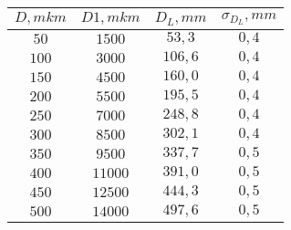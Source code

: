 \begin{tabular}{| c | c | c | c |}
\hline
$D, mkm$ & $D1, mkm$ & $D_L, mm$ & $\sigma_{D_L}, mm$\\
\hline
$50$ & $1500$ & $53,3$ & $0,4$\\
\hline
$100$ & $3000$ & $106,6$ & $0,4$\\
\hline
$150$ & $4500$ & $160,0$ & $0,4$\\
\hline
$200$ & $5500$ & $195,5$ & $0,4$\\
\hline
$250$ & $7000$ & $248,8$ & $0,4$\\
\hline
$300$ & $8500$ & $302,1$ & $0,4$\\
\hline
$350$ & $9500$ & $337,7$ & $0,5$\\
\hline
$400$ & $11000$ & $391,0$ & $0,5$\\
\hline
$450$ & $12500$ & $444,3$ & $0,5$\\
\hline
$500$ & $14000$ & $497,6$ & $0,5$\\
\hline
\end{tabular}
